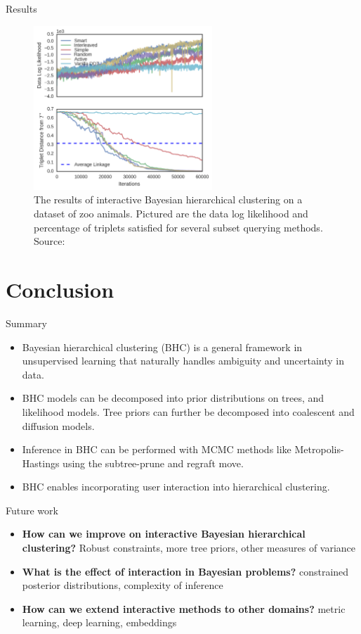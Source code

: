 \documentclass[10pt, compress]{beamer}
\begin{document}
\begin{frame}{Results}
  \begin{figure}
    \centering
    \includegraphics[frame, width=0.6\textwidth]{img/interactive}
    \caption{The results of interactive Bayesian hierarchical clustering
    on a dataset of zoo animals. Pictured are the
    data log likelihood and percentage of triplets
    satisfied for several subset querying methods. Source: \cite{Vikram2016}}
    \label{fig:ibhc}
  \end{figure}
\end{frame}
\section{Conclusion}

\begin{frame}{Summary}
  \begin{itemize}
    \item<1-> Bayesian hierarchical clustering (BHC) is a general framework
      in unsupervised learning that naturally handles
      ambiguity and uncertainty in data.
    \item<2-> BHC models can be decomposed into prior distributions
      on trees, and likelihood models. Tree priors
      can further be decomposed into
      coalescent and diffusion models.
    \item<3-> Inference in BHC can be performed
      with MCMC methods like Metropolis-Hastings
      using the subtree-prune and regraft move.
    \item<4-> BHC enables
      incorporating user interaction
      into hierarchical clustering.
  \end{itemize}
\end{frame}

\begin{frame}{Future work}
  \begin{itemize}
    \item<1-> \textbf{How can we improve on interactive Bayesian hierarchical clustering?}
      Robust constraints, more tree priors, other measures of variance
    \item<2-> \textbf{What is the effect of interaction in Bayesian problems?}
      constrained posterior distributions, complexity of inference
    \item<3-> \textbf{How can we extend interactive methods
      to other domains?} metric learning, deep learning,
      embeddings
  \end{itemize}
\end{frame}
\end{document}
